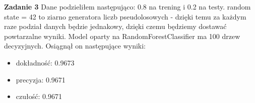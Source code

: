 \documentclass{article}
\begin{document}
\textbf{Zadanie 3} \newline
Dane podzieliłem następująco: 0.8 na trening i 0.2 na testy. 
random state = 42 to ziarno generatora liczb pseudolosowych - dzięki temu za każdym raze podział danych będzie jednakowy,
dzięki czemu będziemy dostawać powtarzalne wyniki. \newline
Model oparty na RandomForestClassifier ma 100 drzew decyzyjnych. Osiągnął on następujące wyniki: \newline
\begin{itemize}
    \item dokładność: 0.9673
    \item precyzja: 0.9671
    \item czułość: 0.9671
\end{itemize}
\end{document}
